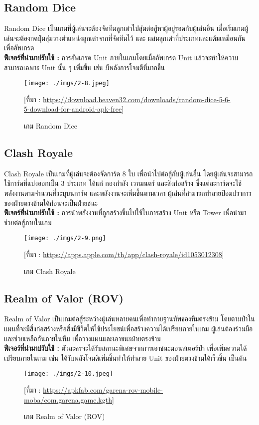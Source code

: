 \documentclass[12pt,oneside,openright,a4paper]{cpe-thai-project}
\begin{document}
\pagebreak
\subsection{Random Dice}
Random Dice เป็นเกมที่ผู้เล่นจะต้องจัดทีมลูกเต๋าไปสุ่มต่อสู้หาผู้อยู่รอดกับผู้เล่นอื่น 
เมื่อเริ่มเกมผู้เล่นจะต้องกดปุ่มสุ่มวางตำแหน่งลูกเต๋าจากที่จัดทีมไว้ และ 
ผสมลูกเต๋าที่ประเภทและแต้มเหมือนกันเพื่ออัพเกรด\\
\textbf{ฟีเจอร์ที่นำมาปรับใช้ : } การอัพเกรด Unit ภายในเกมโดยเมื่ออัพเกรด Unit 
แล้วจะทำให้ความสามารถเฉพาะ Unit นั้น ๆ เพิ่มขึ้น เช่น มีพลังการโจมตีที่มากขึ้น
\begin{figure}[H]\centering
  \texttt{[image: ./imgs/2-8.jpeg]}
  \caption{เกม Random Dice}\label{fig:2-8}
  \small [ที่มา : \url{https://download.heaven32.com/downloads/random-dice-5-6-5-download-for-android-apk-free}]
\end{figure}


\subsection{Clash Royale}
Clash Royale เป็นเกมที่ผู้เล่นจะต้องจัดการ์ด 8 ใบ เพื่อนำไปต่อสู้กับผู้เล่นอื่น 
โดยผู้เล่นจะสามารถใช้การ์ดที่แบ่งออกเป็น 3 ประเภท ได้แก่ กองกำลัง เวทมนตร์ และสิ่งก่อสร้าง 
ซึ่งแต่ละการ์ดจะใช้พลังงานตามจำนวนที่ระบุบนการ์ด และพลังงานจะเพิ่มขึ้นตามเวลา 
ผู้เล่นที่สามารถทำลายป้อมปราการของฝ่ายตรงข้ามได้ก่อนจะเป็นฝ่ายชนะ\\
\textbf{ฟีเจอร์ที่นำมาปรับใช้ : } การนำพลังงานที่ถูกสร้างขึ้นไปใช้ในการสร้าง 
Unit หรือ Tower เพื่อนำมาช่วยต่อสู้ภายในเกม
\begin{figure}[H]\centering
  \texttt{[image: ./imgs/2-9.png]}
  \caption{เกม Clash Royale}\label{fig:2-9}
  \small [ที่มา : \url{https://apps.apple.com/th/app/clash-royale/id1053012308}]
\end{figure}

\pagebreak
\subsection{Realm of Valor (ROV)}
Realm of Valor เป็นเกมต่อสู้ระหว่างผู้เล่นหลายคนเพื่อทำลายฐานทัพของทีมตรงข้าม 
โดยตามป่าในแผนที่จะมีสิ่งก่อสร้างหรือสิ่งมีชีวิตให้ใช้ประโยชน์เพื่อสร้างความได้เปรียบภายในเกม 
ผู้เล่นต้องร่วมมือและช่วยเหลือกันภายในทีม เพื่อวางแผนและเอาชนะฝ่ายตรงข้าม\\
\textbf{ฟีเจอร์ที่นำมาปรับใช้ : } ตัวละครจะได้รับสถานะพิเศษจากการเอาชนะมอนสเตอร์ป่า 
เพื่อเพิ่มความได้เปรียบภายในเกม เช่น ได้รับพลังโจมตีเพิ่มขึ้นทำให้ทำลาย Unit ของฝ่ายตรงข้ามได้เร็วขึ้น เป็นต้น
\begin{figure}[H]\centering
  \texttt{[image: ./imgs/2-10.jpeg]}
  \caption{เกม Realm of Valor (ROV)}\label{fig:2-10}
  \small [ที่มา : \url{https://apkfab.com/garena-rov-mobile-moba/com.garena.game.kgth}]
\end{figure}
\end{document}
